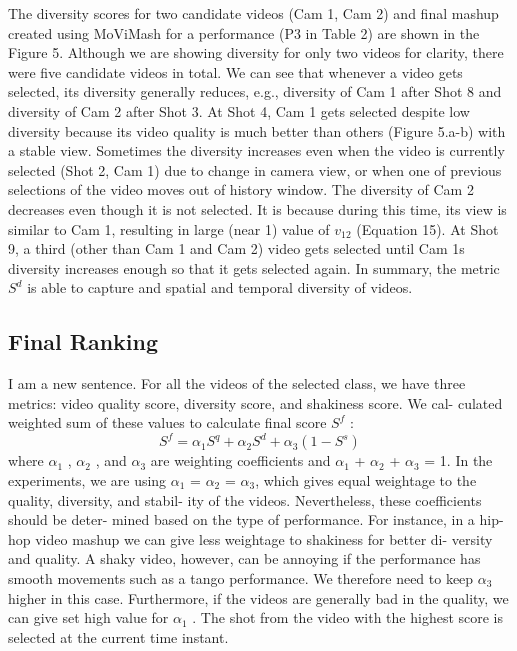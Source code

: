 \documentclass{sig-alternate}
\begin{document}
\begin{enumerate}
The diversity scores for two candidate videos (Cam 1, Cam 2)
and final mashup created using MoViMash for a performance (P3
in Table 2) are shown in the Figure 5. Although we are showing
diversity for only two videos for clarity, there were five candidate
videos in total. We can see that whenever a video gets selected,
its diversity generally reduces, e.g., diversity of Cam 1 after Shot 8
and diversity of Cam 2 after Shot 3. At Shot 4, Cam 1 gets selected
despite low diversity because its video quality is much better than
others (Figure 5.a-b) with a stable view. Sometimes the diversity
increases even when the video is currently selected (Shot 2, Cam 1)
due to change in camera view, or when one of previous selections
of the video moves out of history window. The diversity of Cam 2
decreases even though it is not selected. It is because during this
time, its view is similar to Cam 1, resulting in large (near 1) value
of $v_{12}$ (Equation 15). At Shot 9, a third (other than Cam 1 and Cam
2) video gets selected until Cam 1s diversity increases enough so
that it gets selected again. In summary, the metric $S^d$ is able to
capture and spatial and temporal diversity of videos.
\end{enumerate}

\subsection{Final Ranking}
I am a new sentence.
For all the videos of the selected class, we have three metrics:
video quality score, diversity score, and shakiness score. We cal-
culated weighted sum of these values to calculate final score $S^f$ :
\[S^f = \alpha_1 S^q + \alpha_2 S^d +\alpha_3(1 - S^s)\tag{17}\]
where $\alpha_1$ , $\alpha_2$ , and $\alpha_3$ are weighting coefficients and $\alpha_1$ + $\alpha_2$ +
$\alpha_3$ = 1. In the experiments, we are using $\alpha_1$ = $\alpha_2$ = $\alpha_3$,
which gives equal weightage to the quality, diversity, and stabil-
ity of the videos. Nevertheless, these coefficients should be deter-
mined based on the type of performance. For instance, in a hip-hop
video mashup we can give less weightage to shakiness for better di-
versity and quality. A shaky video, however, can be annoying if the
performance has smooth movements such as a tango performance.
We therefore need to keep $\alpha_3$ higher in this case. Furthermore, if
the videos are generally bad in the quality, we can give set high
value for $\alpha_1$ . The shot from the video with the highest score is
selected at the current time instant.
\end{document}
